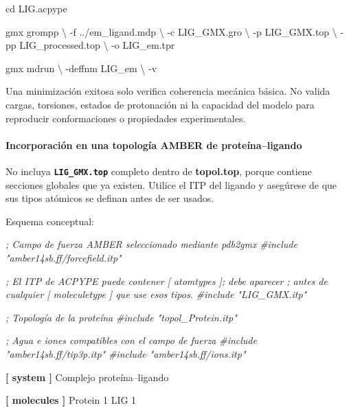 \documentclass[
  spanish,
  11pt,
  a4paper]{article}
\newenvironment{Shaded}{\begin{snugshade}}{\end{snugshade}}
\newcommand{\AttributeTok}[1]{\textcolor[rgb]{0.13,0.29,0.53}{#1}}
\newcommand{\BuiltInTok}[1]{#1}
\newcommand{\CommentTok}[1]{\textcolor[rgb]{0.56,0.35,0.01}{\textit{#1}}}
\newcommand{\DataTypeTok}[1]{\textcolor[rgb]{0.13,0.29,0.53}{#1}}
\newcommand{\ExtensionTok}[1]{#1}
\newcommand{\KeywordTok}[1]{\textcolor[rgb]{0.13,0.29,0.53}{\textbf{#1}}}
\newcommand{\NormalTok}[1]{#1}
\begin{document}
\begin{Shaded}
\begin{Highlighting}[]
\BuiltInTok{cd}\NormalTok{ LIG.acpype}

\ExtensionTok{gmx}\NormalTok{ grompp }\DataTypeTok{\textbackslash{}}
    \AttributeTok{{-}f}\NormalTok{ ../em\_ligand.mdp }\DataTypeTok{\textbackslash{}}
    \AttributeTok{{-}c}\NormalTok{ LIG\_GMX.gro }\DataTypeTok{\textbackslash{}}
    \AttributeTok{{-}p}\NormalTok{ LIG\_GMX.top }\DataTypeTok{\textbackslash{}}
    \AttributeTok{{-}pp}\NormalTok{ LIG\_processed.top }\DataTypeTok{\textbackslash{}}
    \AttributeTok{{-}o}\NormalTok{ LIG\_em.tpr}

\ExtensionTok{gmx}\NormalTok{ mdrun }\DataTypeTok{\textbackslash{}}
    \AttributeTok{{-}deffnm}\NormalTok{ LIG\_em }\DataTypeTok{\textbackslash{}}
    \AttributeTok{{-}v}
\end{Highlighting}
\end{Shaded}

Una minimización exitosa solo verifica coherencia mecánica básica. No
valida cargas, torsiones, estados de protonación ni la capacidad del
modelo para reproducir conformaciones o propiedades experimentales.

\paragraph{Incorporación en una topología AMBER de
proteína--ligando}\label{incorporaciuxf3n-en-una-topologuxeda-amber-de-proteuxednaligando}

No incluya \textbf{\texttt{LIG\_GMX.top}} completo dentro de
\textbf{topol.top}, porque contiene secciones globales que ya existen.
Utilice el ITP del ligando y asegúrese de que sus tipos atómicos se
definan antes de ser usados.

Esquema conceptual:

\begin{Shaded}
\begin{Highlighting}[]
\CommentTok{; Campo de fuerza AMBER seleccionado mediante pdb2gmx}
\CommentTok{\#include "amber14sb.ff/forcefield.itp"}

\CommentTok{; El ITP de ACPYPE puede contener [ atomtypes ]; debe aparecer}
\CommentTok{; antes de cualquier [ moleculetype ] que use esos tipos.}
\CommentTok{\#include "LIG\_GMX.itp"}

\CommentTok{; Topología de la proteína}
\CommentTok{\#include "topol\_Protein.itp"}

\CommentTok{; Agua e iones compatibles con el campo de fuerza}
\CommentTok{\#include "amber14sb.ff/tip3p.itp"}
\CommentTok{\#include "amber14sb.ff/ions.itp"}

\KeywordTok{[ system ]}
\DataTypeTok{Complejo proteína–ligando}

\KeywordTok{[ molecules ]}
\DataTypeTok{Protein    1}
\DataTypeTok{LIG        1}
\end{Highlighting}
\end{Shaded}
\end{document}
